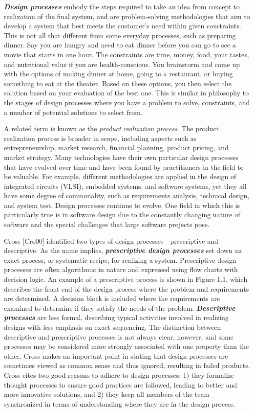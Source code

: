 \emph{\textbf{Design processes}} embody the steps required to take an
idea from concept to realization of the final system, and are
problem-solving methodologies that aim to develop a system that best
meets the customer's need within given constraints. This is not all that
different from some everyday processes, such as preparing dinner. Say
you are hungry and need to eat dinner before you can go to see a movie
that starts in one hour. The constraints are time, money, food, your
tastes, and nutritional value if you are health-conscious. You
brainstorm and come up with the options of making dinner at home, going
to a restaurant, or buying something to eat at the theater. Based on
these options, you then select the solution based on your evaluation of
the best one. This is similar in philosophy to the stages of design
processes where you have a problem to solve, constraints, and a number
of potential solutions to select from.

A related term is known as the \emph{product realization process}. The
product realization process is broader in scope, including aspects such
as entrepreneurship, market research, financial planning, product
pricing, and market strategy. Many technologies have their own
particular design processes that have evolved over time and have been
found by practitioners in the field to be valuable. For example,
different methodologies are applied in the design of integrated circuits
(VLSI), embedded systems, and software systems, yet they all have some
degree of commonality, such as requirements analysis, technical design,
and system test. Design processes continue to evolve. One field in which
this is particularly true is in software design due to the constantly
changing nature of software and the special challenges that large
software projects pose.

Cross {[}Cro00{]} identified two types of design
processes---prescriptive and descriptive. As the name implies,
\emph{\textbf{prescriptive design processes}} set down an exact process,
or systematic recipe, for realizing a system. Prescriptive design
processes are often algorithmic in nature and expressed using flow
charts with decision logic. An example of a prescriptive process is
shown in Figure 1.1, which describes the front end of the design process
where the problem and requirements are determined. A decision block is
included where the requirements are examined to determine if they
satisfy the needs of the problem. \emph{\textbf{Descriptive processes}}
are less formal, describing typical activities involved in realizing
designs with less emphasis on exact sequencing. The distinction between
descriptive and prescriptive processes is not always clear, however, and
some processes may be considered more strongly associated with one
property than the other. Cross makes an important point in stating that
design processes are sometimes viewed as common sense and thus ignored,
resulting in failed products. Cross cites two good reasons to adhere to
design processes: 1) they formalize thought processes to ensure good
practices are followed, leading to better and more innovative solutions,
and 2) they keep all members of the team synchronized in terms of
understanding where they are in the design process.

